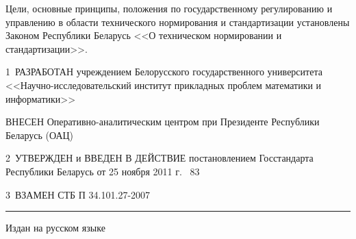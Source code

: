 Цели, основные принципы, положения по государственному регулированию и 
управлению в области технического нормирования и стандартизации 
установлены Законом Республики Беларусь <<О техническом нормировании и 
стандартизации>>.  

\vskip0.2cm

1~РАЗРАБОТАН учреждением Белорусского государственного университета
<<Науч\-но-исследовательский институт прикладных проблем математики и информатики>>

ВНЕСЕН Оперативно-аналитическим центром при Президенте Республики Беларусь (ОАЦ)

2~УТВЕРЖДЕН и ВВЕДЕН В ДЕЙСТВИЕ постановлением Госстандарта Республики 
Беларусь от 25 ноября 2011 г. \No~83 

3~ВЗАМЕН СТБ П 34.101.27-2007 

\vfill

\hrule
\vskip1mm
Издан на русском языке

\pagebreak
